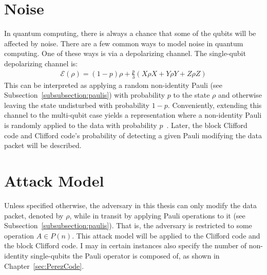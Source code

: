 \section{Noise}
\label{subsec:noise}
In quantum computing, there is always a chance that some of the qubits will be affected by noise. There are a few common ways to model noise in quantum computing. One of these ways is via a depolarizing channel. The single-qubit depolarizing channel is:
\begin{align}
\mathcal{E}(\rho)=(1-p) \rho+\frac{p}{3}(X \rho X+Y \rho Y+Z \rho Z)
\end{align}
This can be interpreted as applying a random non-identity Pauli (see Subsection~\ref{subsubsection:paulis}) with probability $p$ to the state $\rho$ and otherwise leaving the state undisturbed with probability $1-p$. Conveniently, extending this channel to the multi-qubit case yields a representation where a non-identity Pauli is randomly applied to the data with probability $p$~\cite{qiskitDepolarizingChannel}. Later, the block Clifford code and Clifford code's probability of detecting a given Pauli modifying the data packet will be described.

\section{Attack Model}
\label{section:attackModel}
Unless specified otherwise, the adversary in this thesis can only modify the data packet, denoted by $\rho$, while in transit by applying Pauli operations to it (see Subsection~\ref{subsubsection:paulis}). That is, the adversary is restricted to some operation $A \in P(n)$. This attack model will be applied to the Clifford code and the block Clifford code. I may in certain instances also specify the number of non-identity single-qubits the Pauli operator is composed of, as shown in Chapter~\ref{sec:PerezCode}. 

